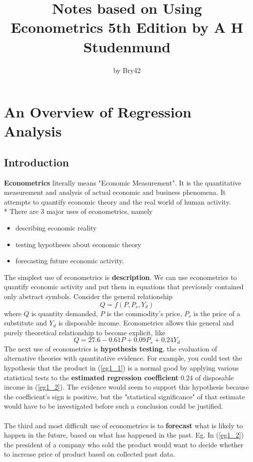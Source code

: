 \documentclass[11pt]{article}
\author{by Bry42}
\begin{document}
\title{Notes based on Using Econometrics 5th Edition by A H Studenmund}
\date{\vspace{-5ex}}
\maketitle
\tableofcontents
\clearpage
\section{An Overview of Regression Analysis}
\subsection{Introduction}
\textbf{Econometrics} literally means "Economic Measurement". It is the quantitative measurement and analysis of actual economic and business phenomena. It attempts to quantify economic theory and the real world of human activity.\\*
There are 3 major uses of econometrics, namely 
\begin{itemize}
\item describing economic reality
\item testing hypotheses about economic theory
\item forecasting future economic activity. 
\end{itemize}
The simplest use of econometrics is \textbf{description}. We can use econometrics to quantify economic activity and put them in equations that previously contained only abstract symbols. Consider the general relationship
\begin{equation} 
Q=f(P, P_s, Y_d) \label{eg1_1} 
\end{equation} 
where $Q$ is quantity demanded, $P$ is the commodity's price, $P_s$ is the price of a substitute and $Y_d$ is disposable income. Econometrics allows this general and purely theoretical relationship to become explicit, like
\begin{equation}
Q=27.6-0.61P+0.09P_s+0.24Y_d \label{eg1_2}
\end{equation}
The next use of econometrics is \textbf{hypothesis testing}, the evaluation of alternative theories with quantitative evidence. For example, you could test the hypothesis that the product in (\ref{eg1_1}) is a normal good  by applying various statistical tests to the \textbf{estimated regression coefficient} $0.24$ of disposable income in (\ref{eg1_2}). The evidence would seem to support this hypothesis because the coefficient's sign is positive, but the "statistical significance" of that estimate would have to be investigated before such a conclusion could be justified. \\ \\
The third and most difficult use of econometrics is to \textbf{forecast} what is likely to happen in the future, based on what has happened in the past. Eg. In (\ref{eg1_2}) the president of a company who sold the product would want to decide whether to increase price of product based on collected past data.
\end{document}
